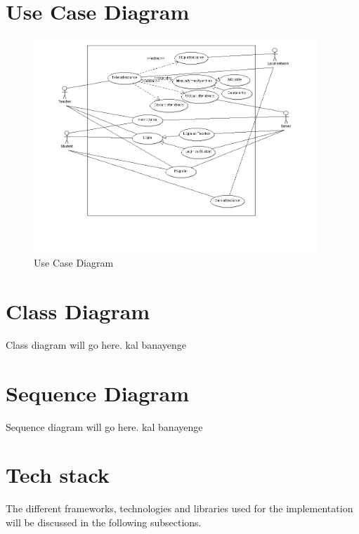 \documentclass{article}
\begin{document}
\section{Use Case Diagram}
\begin{figure}[H]
    \centering
    \includegraphics[width=0.95\textwidth]{UseCaseDiagram.png}
    \caption{Use Case Diagram}
    \label{fig:UseCase}
\end{figure}

\section{Class Diagram}
Class diagram will go here. kal banayenge

\section{Sequence Diagram} 
Sequence diagram will go here. kal banayenge

\section{Tech stack}
The different frameworks, technologies and libraries used for the implementation will be discussed in the following subsections.
\end{document}
